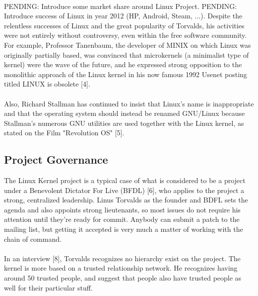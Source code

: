 \documentclass[11pt]{article}
\begin{document}
\\
PENDING: Introduce some market share around Linux Project.
PENDING: Introduce success of Linux in year 2012 (HP, Android, Steam, ...).
Despite the relentless successes of Linux and the great popularity of Torvalds, his activities were not entirely without controversy, even within the free software community. For example, Professor Tanenbaum, the developer of MINIX on which Linux was originally partially based, was convinced that microkernels (a minimalist type of kernel) were the wave of the future, and he expressed strong opposition to the monolithic approach of the Linux kernel in his now famous 1992 Usenet posting titled LINUX is obsolete [4].\\
\\
Also, Richard Stallman has continued to insist that Linux's name is inappropriate and that the operating system should instead be renamed GNU/Linux because Stallman's numerous GNU utilities are used together with the Linux kernel, as stated on the Film "Revolution OS" [5].

\subsection{Project Governance}
The Linux Kernel project is a typical case of what is considered to be a project under a Benevolent Dictator For Live (BFDL) [6], who applies to the project a strong, centralized leadership. Linus Torvalds as the founder and BDFL sets the agenda and also appoints strong lieutenants, so most issues do not require his attention until they're ready for commit. Anybody can submit a patch to the mailing list, but getting it accepted is very much a matter of working with the chain of command.\\
\\
In an interview [8], Torvalds recognizes no hierarchy exist on the project. The kernel is more based on a trusted relationship network. He recognizes having around 50 trusted people, and suggest that people also have trusted people as well for their particular stuff. 
\end{document}
